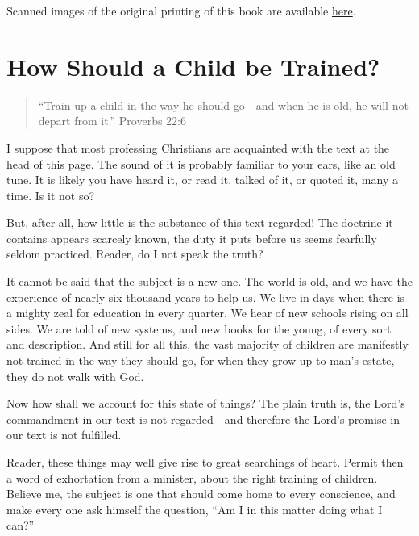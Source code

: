 \documentclass[
]{book}
\begin{document}
Scanned images of the original printing of this book are available \href{https://www.google.com/books/edition/Wheat_Or_Chaff/il5QAQAAMAAJ?hl=en\&gbpv=1\&pg=PA219\&printsec=frontcover}{here}.

\clearpage
\setcounter{page}{1}

\hypertarget{how-should-a-child-be-trained}{%
\chapter*{How Should a Child be Trained?}\label{how-should-a-child-be-trained}}

\begin{quote}
``Train up a child in the way he should go---and when he is old, he will not depart from it.'' Proverbs 22:6
\end{quote}

I suppose that most professing Christians are acquainted with the text at the head of this page. The sound of it is probably familiar to your ears, like an old tune. It is likely you have heard it, or read it, talked of it, or quoted it, many a time. Is it not so?

But, after all, how little is the substance of this text regarded! The doctrine it contains appears scarcely known, the duty it puts before us seems fearfully seldom practiced. Reader, do I not speak the truth?

It cannot be said that the subject is a new one. The world is old, and we have the experience of nearly six thousand years to help us. We live in days when there is a mighty zeal for education in every quarter. We hear of new schools rising on all sides. We are told of new systems, and new books for the young, of every sort and description. And still for all this, the vast majority of children are manifestly not trained in the way they should go, for when they grow up to man's estate, they do not walk with God.

Now how shall we account for this state of things? The plain truth is, the Lord's commandment in our text is not regarded---and therefore the Lord's promise in our text is not fulfilled.

Reader, these things may well give rise to great searchings of heart. Permit then a word of exhortation from a minister, about the right training of children. Believe me, the subject is one that should come home to every conscience, and make every one ask himself the question, ``Am I in this matter doing what I can?''
\end{document}
